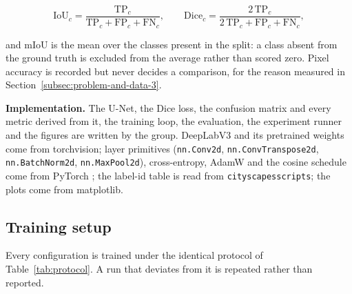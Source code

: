 \begin{equation}
    \mathrm{IoU}_c = \frac{\mathrm{TP}_c}{\mathrm{TP}_c + \mathrm{FP}_c + \mathrm{FN}_c},
    \qquad
    \mathrm{Dice}_c = \frac{2\,\mathrm{TP}_c}{2\,\mathrm{TP}_c + \mathrm{FP}_c + \mathrm{FN}_c},
\end{equation}

and mIoU is the mean over the classes present in the split: a class absent from the ground truth
is excluded from the average rather than scored zero. Pixel accuracy is
recorded but never decides a comparison, for the reason measured in
Section~\ref{subsec:problem-and-data-3}.

\textbf{Implementation.} The U-Net, the Dice loss, the confusion matrix and every metric derived
from it, the training loop, the evaluation, the experiment runner and the figures are written by
the group. DeepLabV3 and its pretrained weights come from torchvision; layer primitives
(\texttt{nn.Conv2d}, \texttt{nn.ConvTranspose2d}, \texttt{nn.BatchNorm2d},
\texttt{nn.MaxPool2d}), cross-entropy, AdamW and the cosine schedule come from PyTorch
\cite{paszke2019pytorch}; the label-id table is read from \texttt{cityscapesscripts}; the plots
come from matplotlib.

\subsection{Training setup}
\label{subsec:methodology-3}

Every configuration is trained under the identical protocol of Table~\ref{tab:protocol}. A run
that deviates from it is repeated rather than reported.

